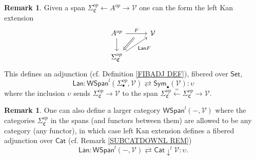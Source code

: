 \documentclass[a4paper,10pt
,draft
]{article}%
\numberwithin{equation}{section}
\numberwithin{figure}{section}
\theoremstyle{definition} %
\newtheorem{remark}[equation]{Remark}%
\newcommand{\1}{\ensuremath{\mathbbm 1}}%
\begin{document}
\begin{remark}\label{LANADJ REM}
	Given a span $\Sigma^{op}_{\mathfrak{C}} \leftarrow A^{op} \rightarrow \mathcal{V}$
	one can the form the left Kan extension
	\[
	\begin{tikzcd}[column sep = 30pt]
	A^{op}
	\ar{r}[name=U,swap]{}{F} \ar{d} 
	&
	\mathcal{V}	
	\\
	|[alias=V]|
	\Sigma_{\mathfrak{C}}^{op} 
	\ar{ru}[swap]{\mathsf{Lan} F}
	\arrow[Leftarrow, from=V, to=U,shorten >=0.05cm,shorten <=0.05cm]
	\end{tikzcd}
	\]
	This defines an adjunction (cf. Definition \ref{FIBADJ DEF}),
	fibered over $\mathsf{Set}$,
	\[
	\mathsf{Lan} \colon
	\mathsf{WSpan}^l(\Sigma_{\bullet}^{op},\mathcal{V}) 
	\rightleftarrows
	\mathsf{Sym}_{\bullet}(\mathcal{V})
	\colon \upsilon
	\]
	where the inclusion $\upsilon$ sends $\Sigma^{op}_{\mathfrak{C}} \to \mathcal{V}$ 
	to the span
	$\Sigma^{op}_{\mathfrak{C}} \xleftarrow{=} \Sigma^{op}_{\mathfrak{C}} \to \mathcal{V}$.
\end{remark}



\begin{remark}
	One can also define a larger category 
	$\mathsf{WSpan}^l( - ,\mathcal{V})$
	where the categories $\Sigma_{\mathfrak{C}}^{op}$ in the spans (and functors between them) are allowed to be any category (any functor),
	in which case left Kan extension defines a fibered adjunction over 
	$\mathsf{Cat}$ (cf. Remark \ref{SUBCATDOWNL REM})
	\[
	\mathsf{Lan} \colon
	\mathsf{WSpan}^l( - ,\mathcal{V}) 
	\rightleftarrows
	\mathsf{Cat} \downarrow ^l \mathcal{V}
	\colon \upsilon.
	\]
\end{remark}
\end{document}
